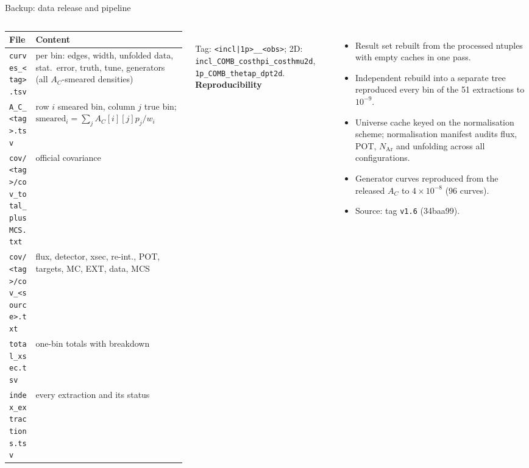\documentclass[aspectratio=169,10pt]{beamer}
\begin{document}
\begin{frame}{Backup: data release and pipeline}
  \begin{columns}[T]
  \scriptsize\setlength{\tabcolsep}{3pt}
  \begin{tabular}{@{}p{3.1cm}p{4.9cm}@{}}
    \toprule
    File & Content \\\midrule
    \texttt{curves\_<tag>.tsv} & per bin: edges, width, unfolded data, stat.\ error, truth, tune, generators (all $A_C$-smeared densities) \\
    \texttt{A\_C\_<tag>.tsv} & row $i$ smeared bin, column $j$ true bin; $\mathrm{smeared}_i=\sum_j A_C[i][j]p_j/w_i$ \\
    \texttt{cov/<tag>/cov\_total\_plusMCS.txt} & official covariance \\
    \texttt{cov/<tag>/cov\_<source>.txt} & flux, detector, xsec, re-int., POT, targets, MC, EXT, data, MCS \\
    \texttt{total\_xsec.tsv} & one-bin totals with breakdown \\
    \texttt{index\_extractions.tsv} & every extraction and its status \\
    \bottomrule
  \end{tabular}\\[1mm]
  Tag: \texttt{<incl|1p>\_<FHC5|RHCFULL|COMB>\_<obs>}; 2D: \texttt{incl\_COMB\_costhpi\_costhmu2d}, \texttt{1p\_COMB\_thetap\_dpt2d}.
  \scriptsize
  \textbf{Reproducibility}
  \begin{itemize}\setlength\itemsep{2pt}
    \item Result set rebuilt from the processed ntuples with empty caches in one pass.
    \item Independent rebuild into a separate tree reproduced every bin of the 51 extractions to $10^{-9}$.
    \item Universe cache keyed on the normalisation scheme; normalisation manifest audits flux, POT, $N_\mathrm{Ar}$ and unfolding across all configurations.
    \item Generator curves reproduced from the released $A_C$ to $4\times10^{-8}$ (96 curves).
    \item Source: tag \texttt{v1.6} (34baa99).
  \end{itemize}
  \end{columns}
\end{frame}
\end{document}
